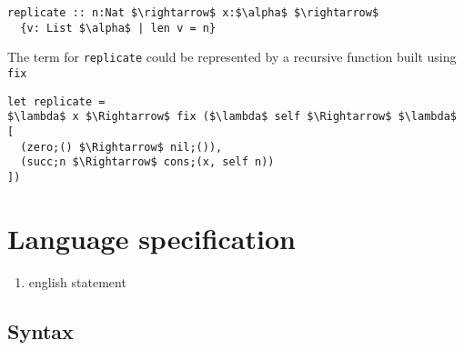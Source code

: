 \documentclass[sigplan,screen]{acmart}
\begin{document}
\begin{lstlisting}[keywords={termination, measure, data, where}]
replicate :: n:Nat $\rightarrow$ x:$\alpha$ $\rightarrow$ 
  {v: List $\alpha$ | len v = n}

\end{lstlisting}

\hfill

\noindent The term for \lstinline{replicate} could be represented by a recursive function built using \lstinline{fix} 

\begin{lstlisting}[]
let replicate = 
$\lambda$ x $\Rightarrow$ fix ($\lambda$ self $\Rightarrow$ $\lambda$ [
  (zero;() $\Rightarrow$ nil;()),
  (succ;n $\Rightarrow$ cons;(x, self n))
]) 
\end{lstlisting}


\section{Language specification}
\begin{enumerate}
  \item english statement 
\end{enumerate}
\subsection{Syntax}
\end{document}
